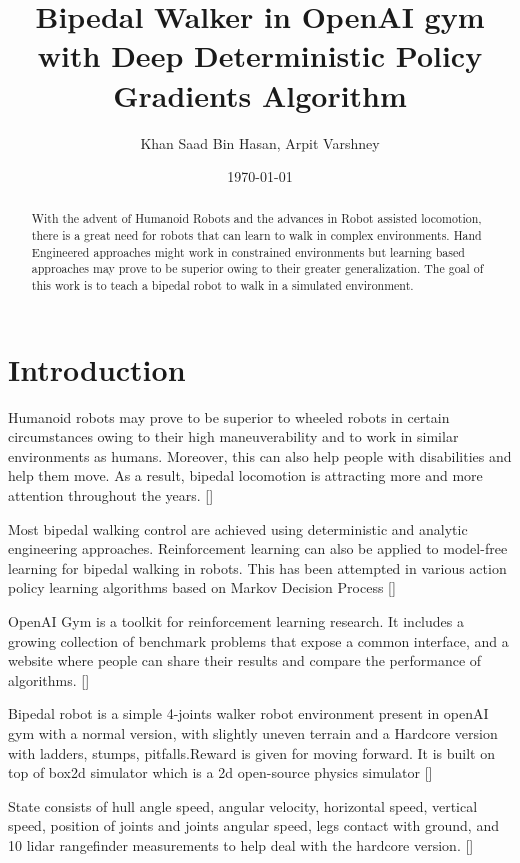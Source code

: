 \documentclass[a4paper]{article}
\title{Bipedal Walker in OpenAI gym with Deep Deterministic Policy Gradients Algorithm}
\author{Khan Saad Bin Hasan, Arpit Varshney}
\date{\today} %
\begin{document}
\maketitle

\begin{abstract}
With the advent of Humanoid Robots and the advances in Robot assisted locomotion, there is a great need for robots that can learn to walk in complex environments. Hand Engineered approaches might work in constrained environments but learning based approaches may prove to be superior owing to their greater generalization. The goal of this work is to teach a bipedal robot to walk in a simulated environment.
\end{abstract}

\section*{Introduction}

Humanoid robots may prove to be superior to wheeled robots in certain circumstances owing to their high maneuverability and to work in similar environments as humans. Moreover, this can also help people with disabilities and help them move. As a result, bipedal locomotion is attracting more and more attention throughout the years. [\cite{song2017recurrent:2017}]

Most bipedal walking control are achieved using deterministic and analytic engineering approaches. Reinforcement learning can also be applied to model-free learning for bipedal walking in robots. This has been attempted in various action policy learning algorithms based on Markov Decision Process [\cite{song2017recurrent:2017}]

OpenAI Gym is a toolkit for reinforcement learning research. It includes a growing collection of benchmark problems that expose a common interface, and a website where people can share their results and compare the performance of algorithms. [\cite{brockman2016openai:2016}]

Bipedal robot is a simple 4-joints walker robot environment present in openAI gym with a normal version, with slightly uneven terrain and a Hardcore version with ladders, stumps, pitfalls.Reward is given for moving forward. It is built on top of box2d simulator which is  a 2d open-source physics simulator [\cite{catto2011box2d:2019}]

State consists of hull angle speed, angular velocity, horizontal speed, vertical speed, position of joints and joints angular speed, legs contact with ground, and 10 lidar rangefinder measurements to help deal with the hardcore version. [\cite{bipedalsource:2019}]
\end{document}
